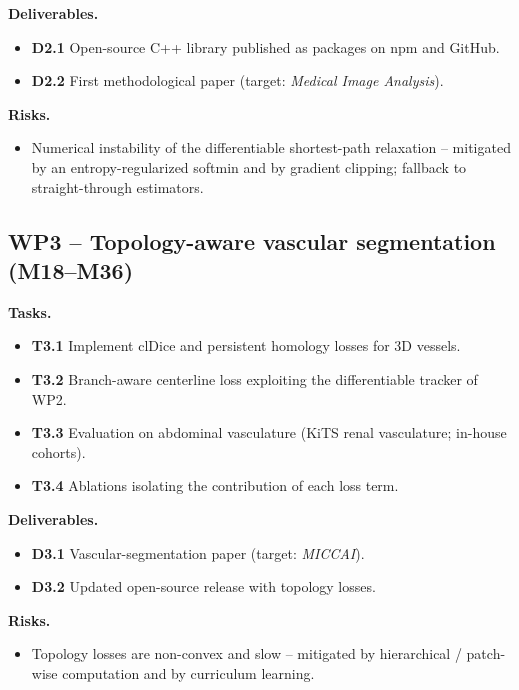 \documentclass[a4paper,11pt,twoside]{article}
\begin{document}
\textbf{Deliverables.}
\begin{itemize}[noitemsep, topsep=3pt]
  \item \textbf{D2.1} Open-source C++ library published as packages on npm
        and GitHub.
  \item \textbf{D2.2} First methodological paper (target: \textit{Medical Image
        Analysis}).
\end{itemize}

\textbf{Risks.}
\begin{itemize}[noitemsep, topsep=3pt]
  \item Numerical instability of the differentiable shortest-path relaxation --
        mitigated by an entropy-regularized softmin and by gradient clipping;
        fallback to straight-through estimators.
\end{itemize}

\subsection{WP3 -- Topology-aware vascular segmentation (M18--M36)}

\textbf{Tasks.}
\begin{itemize}[noitemsep, topsep=3pt]
  \item \textbf{T3.1} Implement clDice and persistent homology losses for 3D
        vessels.
  \item \textbf{T3.2} Branch-aware centerline loss exploiting the differentiable
        tracker of WP2.
  \item \textbf{T3.3} Evaluation on abdominal vasculature (KiTS renal
        vasculature; in-house cohorts).
  \item \textbf{T3.4} Ablations isolating the contribution of each loss term.
\end{itemize}

\textbf{Deliverables.}
\begin{itemize}[noitemsep, topsep=3pt]
  \item \textbf{D3.1} Vascular-segmentation paper (target: \textit{MICCAI}).
  \item \textbf{D3.2} Updated open-source release with topology losses.
\end{itemize}

\textbf{Risks.}
\begin{itemize}[noitemsep, topsep=3pt]
  \item Topology losses are non-convex and slow -- mitigated by hierarchical /
        patch-wise computation and by curriculum learning.
\end{itemize}
\end{document}
